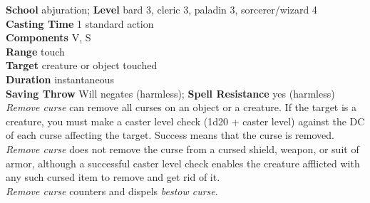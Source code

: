 \textbf{School }abjuration; \textbf{Level }bard 3, cleric 3, paladin 3, sorcerer/wizard 4\\
\textbf{Casting Time }1 standard action\\
\textbf{Components }V, S\\
\textbf{Range }touch\\
\textbf{Target }creature or object touched\\
\textbf{Duration }instantaneous\\
\textbf{Saving Throw }Will negates (harmless); \textbf{Spell Resistance }yes (harmless)\\
\textit{Remove curse }can remove all curses on an object or a creature. If the target is a creature, you must make a caster level check (1d20 + caster level) against the DC of each curse affecting the target. Success means that the curse is removed. \textit{Remove curse }does not remove the curse from a cursed shield, weapon, or suit of armor, although a successful caster level check enables the creature afflicted with any such cursed item to remove and get rid of it.\\
\textit{Remove curse} counters and dispels \textit{bestow curse}.\\
